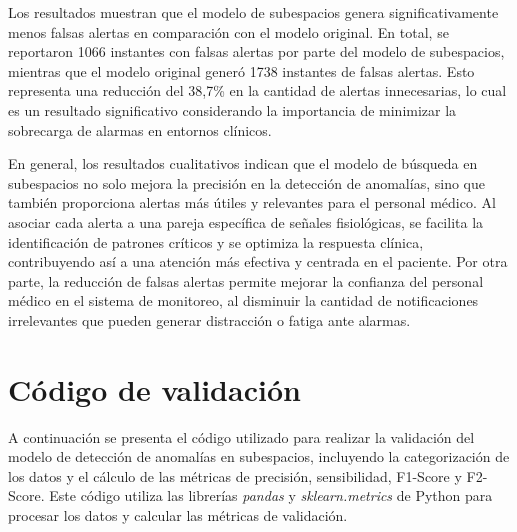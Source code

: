Los resultados muestran que el modelo de subespacios genera significativamente menos falsas alertas en comparación con el modelo original. En total, se reportaron 1066 instantes con falsas alertas por parte del modelo de subespacios, mientras que el modelo original generó 1738 instantes de falsas alertas. Esto representa una reducción del 38,7\% en la cantidad de alertas innecesarias, lo cual es un resultado significativo considerando la importancia de minimizar la sobrecarga de alarmas en entornos clínicos.

En general, los resultados cualitativos indican que el modelo de búsqueda en subespacios no solo mejora la precisión en la detección de anomalías, sino que también proporciona alertas más útiles y relevantes para el personal médico. Al asociar cada alerta a una pareja específica de señales fisiológicas, se facilita la identificación de patrones críticos y se optimiza la respuesta clínica, contribuyendo así a una atención más efectiva y centrada en el paciente. Por otra parte, la reducción de falsas alertas permite mejorar la confianza del personal médico en el sistema de monitoreo, al disminuir la cantidad de notificaciones irrelevantes que pueden generar distracción o fatiga ante alarmas.

\section{Código de validación}

A continuación se presenta el código utilizado para realizar la validación del modelo de detección de anomalías en subespacios, incluyendo la categorización de los datos y el cálculo de las métricas de precisión, sensibilidad, F1-Score y F2-Score. Este código utiliza las librerías \textit{pandas} y \textit{sklearn.metrics} de Python para procesar los datos y calcular las métricas de validación.

